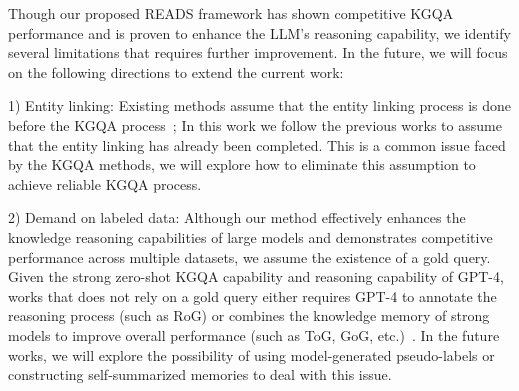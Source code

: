 \documentclass[11pt]{article}
\begin{document}
Though our proposed READS framework has shown competitive KGQA performance and is proven to enhance the LLM's reasoning capability, we identify several limitations that requires further improvement. In the future, we will focus on the following directions to extend the current work:

1) Entity linking: Existing methods assume that the entity linking process is done before the KGQA process~\cite{rog,ToG}; In this work we follow the previous works to assume that the entity linking has already been completed. This is a common issue faced by the KGQA methods, we will explore how to eliminate this assumption to achieve reliable KGQA process.

2) Demand on labeled data: Although our method effectively enhances the knowledge reasoning capabilities of large models and demonstrates competitive performance across multiple datasets, we assume the existence of a gold query. Given the strong zero-shot KGQA capability and reasoning capability of GPT-4, works that does not rely on a gold query either requires GPT-4 to annotate the reasoning process (such as RoG) or combines the knowledge memory of strong models to improve overall performance (such as ToG, GoG, etc.)~\cite{rog,ToG,xu2024generate}. In the future works, we will explore the possibility of using model-generated pseudo-labels or constructing self-summarized memories to deal with this issue.




%

\end{document}
